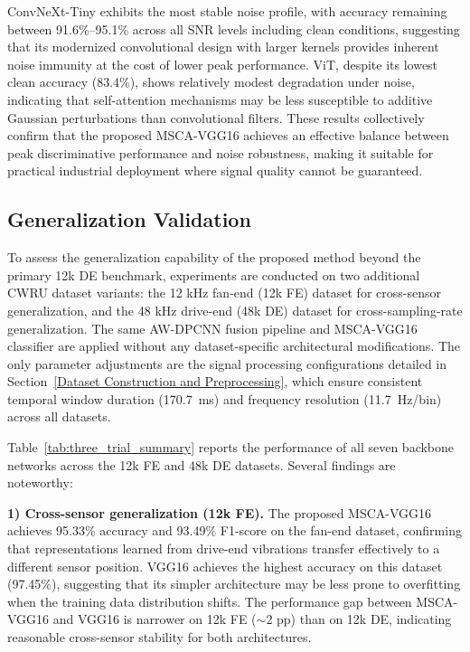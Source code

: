 \documentclass[journal]{IEEEtran}
\begin{document}
ConvNeXt-Tiny exhibits the most stable noise profile, with accuracy remaining between 91.6\%--95.1\% across all SNR levels including clean conditions, suggesting that its modernized convolutional design with larger kernels provides inherent noise immunity at the cost of lower peak performance. ViT, despite its lowest clean accuracy (83.4\%), shows relatively modest degradation under noise, indicating that self-attention mechanisms may be less susceptible to additive Gaussian perturbations than convolutional filters. These results collectively confirm that the proposed MSCA-VGG16 achieves an effective balance between peak discriminative performance and noise robustness, making it suitable for practical industrial deployment where signal quality cannot be guaranteed.

\subsection{Generalization Validation}
\label{sec:generalization}

To assess the generalization capability of the proposed method beyond the primary 12k DE benchmark, experiments are conducted on two additional CWRU dataset variants: the 12 kHz fan-end (12k FE) dataset for cross-sensor generalization, and the 48 kHz drive-end (48k DE) dataset for cross-sampling-rate generalization. The same AW-DPCNN fusion pipeline and MSCA-VGG16 classifier are applied without any dataset-specific architectural modifications. The only parameter adjustments are the signal processing configurations detailed in Section~\ref{Dataset Construction and Preprocessing}, which ensure consistent temporal window duration (170.7~ms) and frequency resolution (11.7~Hz/bin) across all datasets.



Table~\ref{tab:three_trial_summary} reports the performance of all seven backbone networks across the 12k FE and 48k DE datasets. Several findings are noteworthy:

\textbf{1) Cross-sensor generalization (12k FE).} The proposed MSCA-VGG16 achieves 95.33\% accuracy and 93.49\% F1-score on the fan-end dataset, confirming that representations learned from drive-end vibrations transfer effectively to a different sensor position. VGG16 achieves the highest accuracy on this dataset (97.45\%), suggesting that its simpler architecture may be less prone to overfitting when the training data distribution shifts. The performance gap between MSCA-VGG16 and VGG16 is narrower on 12k FE ($\sim$2 pp) than on 12k DE, indicating reasonable cross-sensor stability for both architectures.
\end{document}
